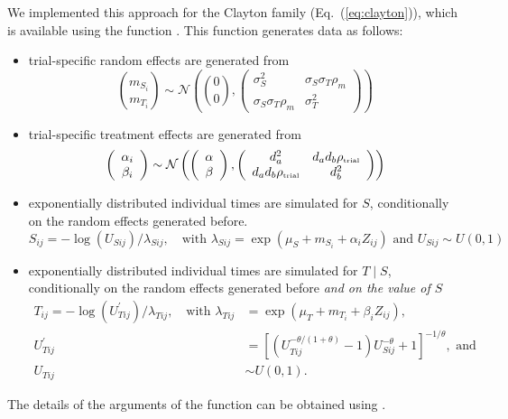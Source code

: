 \documentclass[article,shortnames, nojss]{jss}\usepackage[]{graphicx}\usepackage[]{color}
\begin{document}
We implemented this approach for the Clayton family (Eq.~(\ref{eq:clayton})),
  which is available using the function .
This function generates data as follows:
  \begin{itemize}
    \item trial-specific random effects are generated from
      $$
      \binom{m_{S_i}}{m_{T_i}} \sim \mathcal N \left(
      \binom00, \left(\begin{array}{cc}
      \sigma^2_S & \sigma_S\sigma_T\rho_m \\
      \sigma_S\sigma_T\rho_m &  \sigma^2_T
      \end{array}\right)
      \right)
      $$
    \item trial-specific treatment effects are generated from
      $$
      \left(\begin{array}{c} 
      {\alpha_i}\\ {\beta_i}\end{array}\right)
      \sim \mathcal N
      \left(
      \left(\begin{array}{c}
      \alpha\\ \beta\end{array}\right), 
      \left(\begin{array}{cc} 
      d_a^2 &
      d_a d_b{\rho_\text{\tiny trial}} \\
      d_a d_b{\rho_\text{\tiny trial}} &
      d_b^2 \\
      \end{array}\right)
      \right)
      $$
    \item exponentially distributed individual times are simulated
      for $S$, conditionally on the random effects generated before.
      $$
      S_{ij} = -\log(U_{Sij}) / \lambda_{Sij},
      \quad \text{with } 
      \lambda_{Sij} = \exp(\mu_S + m_{S_i} + \alpha_i Z_{ij})
      \text{ and } U_{Sij} \sim U(0,1)
      $$
    \item exponentially distributed individual times are simulated
      for $T\mid S$, conditionally on the random effects generated before
      \textit{and on the value of $S$}
      \begin{align*}
      T_{ij} = -\log(U^\prime_{Tij}) / \lambda_{Tij},
      \quad \text{with }
      \lambda_{Tij} &= \exp(\mu_T + m_{T_i} + \beta_i  Z_{ij}), \\
      U_{Tij}^\prime &= \left[\left(U_{Tij}^{-\theta/(1+\theta)} - 1
      \right) U_{Sij}^{-\theta} + 1 \right]^{-1/\theta}, \text{ and}\\
      U_{Tij} &\sim U(0,1).
    \end{align*}
  \end{itemize}
The details of the arguments of the  function can be 
  obtained using .
\end{document}
